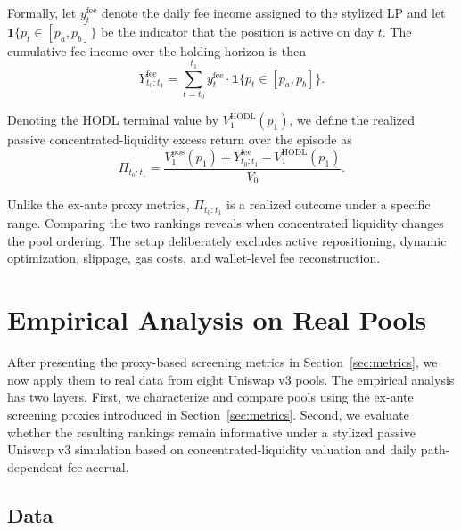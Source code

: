\documentclass[10pt,conference,compsocconf]{IEEEtran}
\begin{document}
{Formally, let $y^{\mathrm{fee}}_t$ denote the daily fee income assigned to the stylized LP and let $\mathbf{1}\{p_t \in [p_a,p_b]\}$ be the indicator that the position is active on day $t$. The cumulative fee income over the holding horizon is then}
\begin{equation}
\label{eq:cum_fee_income}
Y^{\mathrm{fee}}_{t_0:t_1}
=
\sum_{t=t_0}^{t_1}
y^{\mathrm{fee}}_t \cdot \mathbf{1}\{p_t \in [p_a,p_b]\}.
\end{equation}

{Denoting the HODL terminal value by $V^{\mathrm{HODL}}_1(p_1)$, we define the realized passive concentrated-liquidity excess return over the episode as}
\begin{equation}
\label{eq:passive_v3_profit}
\Pi_{t_0:t_1}
=
\frac{V^{\mathrm{pos}}_1(p_1)+Y^{\mathrm{fee}}_{t_0:t_1}-V^{\mathrm{HODL}}_1(p_1)}{V_0}.
\end{equation}

Unlike the ex-ante proxy metrics, $\Pi_{t_0:t_1}$ is a realized outcome under a specific range. Comparing the two rankings reveals when concentrated liquidity changes the pool ordering. The setup deliberately excludes active repositioning, dynamic optimization, slippage, gas costs, and wallet-level fee reconstruction.



\section{Empirical Analysis on Real Pools}
\label{sec:empirical_analysis}

After presenting the proxy-based screening metrics in Section~\ref{sec:metrics}, we now apply them to real data from eight Uniswap v3 pools. The empirical analysis has two layers. First, we characterize and compare pools using the ex-ante screening proxies introduced in Section~\ref{sec:metrics}. Second, we evaluate whether the resulting rankings remain informative under a stylized passive Uniswap v3 simulation based on concentrated-liquidity valuation and daily path-dependent fee accrual.


\subsection{Data}
\end{document}
